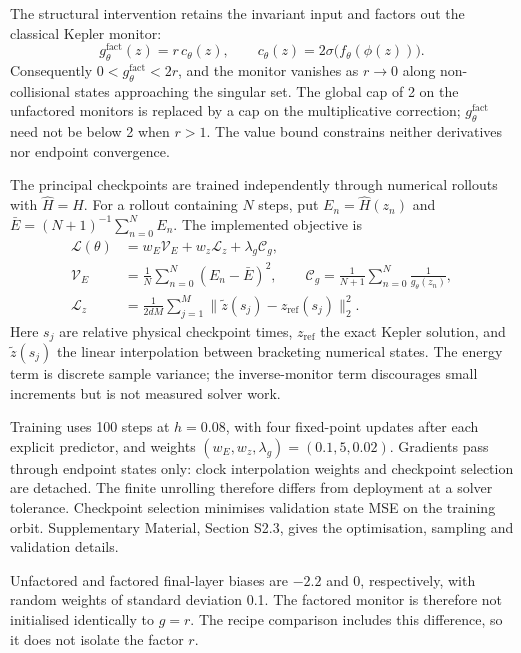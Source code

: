 \documentclass[final,3p,times]{elsarticle}
\begin{document}
The structural intervention retains the invariant input and factors out
the classical Kepler monitor:
\begin{equation}
 g_\theta^{\mathrm{fact}}(z)=r\,c_\theta(z),\qquad
 c_\theta(z)=2\sigma\bigl(f_\theta(\phi(z))\bigr).
 \label{eq:factored-monitor}
\end{equation}
Consequently $0<g_\theta^{\mathrm{fact}}<2r$, and the monitor vanishes as
$r\to0$ along non-collisional states approaching the singular set.
The global cap of 2 on the unfactored monitors is replaced by a cap on the
multiplicative correction; $g_\theta^{\mathrm{fact}}$ need not be below 2
when $r>1$. The value bound constrains neither derivatives nor endpoint convergence.

The principal checkpoints are trained independently through numerical
rollouts with $\widehat H=H$. For a rollout containing $N$ steps, put
$E_n=\widehat H(z_n)$ and $\bar E=(N+1)^{-1}\sum_{n=0}^N E_n$. The
implemented objective is
\begin{align}
 \mathcal L(\theta)
 &=w_E\mathcal V_E+w_z\mathcal L_z+\lambda_g\mathcal C_g,
 \label{eq:monitor-loss}\\
 \mathcal V_E&=\frac1N\sum_{n=0}^N(E_n-\bar E)^2,\qquad
 \mathcal C_g=\frac1{N+1}\sum_{n=0}^N\frac1{g_\theta(z_n)},
 \label{eq:energy-cost-loss}\\
 \mathcal L_z&=\frac1{2dM}\sum_{j=1}^M
   \|\widetilde z(s_j)-z_{\mathrm{ref}}(s_j)\|_2^2.
 \label{eq:checkpoint-loss}
\end{align}
Here $s_j$ are relative physical checkpoint times, $z_{\mathrm{ref}}$ the
exact Kepler solution, and $\widetilde z(s_j)$ the linear interpolation
between bracketing numerical states. The energy term is discrete sample
variance; the inverse-monitor term discourages small increments but is
not measured solver work.

Training uses 100 steps at $h=0.08$, with four fixed-point updates after
each explicit predictor, and weights $(w_E,w_z,\lambda_g)=(0.1,5,0.02)$.
Gradients pass through endpoint states only: clock interpolation weights
and checkpoint selection are detached. The finite unrolling therefore
differs from deployment at a solver tolerance. Checkpoint selection
minimises validation state MSE on the training orbit. Supplementary
Material, Section S2.3, gives the optimisation, sampling and validation
details.

Unfactored and factored final-layer biases are $-2.2$ and 0, respectively,
with random weights of standard deviation 0.1. The factored monitor is
therefore not initialised identically to $g=r$. The recipe comparison includes this difference,
so it does not isolate the factor $r$.
\end{document}
